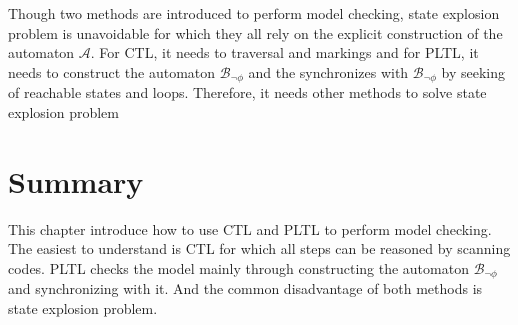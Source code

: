 \documentclass[11pt, conference]{IEEEtran}
\begin{document}
    Though two methods are introduced to perform model checking, state explosion problem is unavoidable for which they all rely on the explicit construction of the automaton $\mathcal{A}$. For CTL, it needs to traversal and markings and for PLTL, it needs to construct the automaton $\mathcal{B_{\neg\phi}}$ and the synchronizes with  $\mathcal{B_{\neg\phi}}$ by seeking of reachable states and loops. Therefore, it needs other methods to solve state explosion problem
    
    \section{Summary}
    This chapter introduce how to use CTL and PLTL to perform model checking. The easiest to understand is CTL for which all steps can be reasoned by scanning codes. PLTL checks the model mainly through constructing the automaton $\mathcal{B_{\neg\phi}}$ and synchronizing with it. And the common disadvantage of both methods is state explosion problem.
\end{document}
